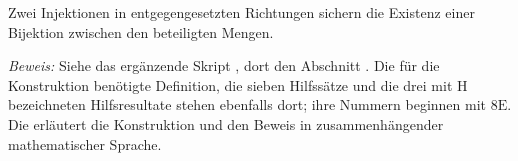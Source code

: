 Zwei Injektionen in entgegengesetzten Richtungen sichern die Existenz
einer Bijektion zwischen den beteiligten Mengen.

{}
\setcounter{formulaThm}{3}
\CSBFixedInjections
\noindent\emph{Beweis:} Siehe das ergänzende Skript
\CSBProofsLink{}, dort den Abschnitt \CSBMainProofLink{}.
Die für die Konstruktion benötigte Definition, die sieben Hilfssätze
und die drei mit H bezeichneten Hilfsresultate stehen ebenfalls dort;
ihre Nummern beginnen mit \(8\mathrm{E}\).
Die \CSBReadingLink{} erläutert die Konstruktion und den Beweis
in zusammenhängender mathematischer Sprache.
